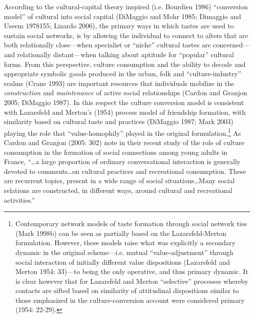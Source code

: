 According to the cultural-capital theory inspired (i.e. Bourdieu 1986) ``conversion model'' of cultural into social capital (DiMaggio and Mohr 1985; Dimaggio and Useem 1978155; Lizardo 2006), the primary ways in which tastes are used to sustain social networks, is by allowing the individual to connect to alters that are both relationally close---when specialist or ``niche'' cultural tastes are concerned---and relationally distant---when talking about aptitude for ``popular'' cultural forms. From this perspective, culture consumption and the ability to decode and appropriate symbolic goods produced in the urban, folk and ``culture-industry'' realms (Crane 1993) are important resources that individuals mobilize in the \emph{construction} and \emph{maintenance} of active social relationships (Cardon and Granjon 2005; DiMaggio 1987). In this respect the culture conversion model is consistent with Lazarsfeld and Merton's (1954) process model of friendship formation, with similarity based on cultural taste and practices (DiMaggio 1987; Mark 2003) playing the role that ``value-homophily'' played in the original formulation.\footnote{Contemporary network models of taste formation through social network ties (Mark 1998b) can be seen as partially based on the Lazarsfeld-Merton formulation. However, these models raise what was explicitly a secondary dynamic in the original scheme---i.e. mutual ``value-adjustment'' through social interaction of initially different value dispositions (Lazarsfeld and Merton 1954: 33)---to being the only operative, and thus primary dynamic. It is clear however that for Lazarsfeld and Merton ``selective'' processes whereby contacts are sifted based on similarity of attitudinal dispositions similar to those emphasized in the culture-conversion account were considered primary (1954: 22-29).} As Cardon and Granjon (2005: 302) note in their recent study of the role of culture consumption in the formation of social connections among young adults in France, ``\ldots a large proportion of ordinary conversational interaction is generally devoted to comments\ldots on cultural practices and recreational consumption. These are recurrent topics, present in a wide range of social situations\ldots Many social relations are constructed, in different ways, around cultural and recreational activities.''

